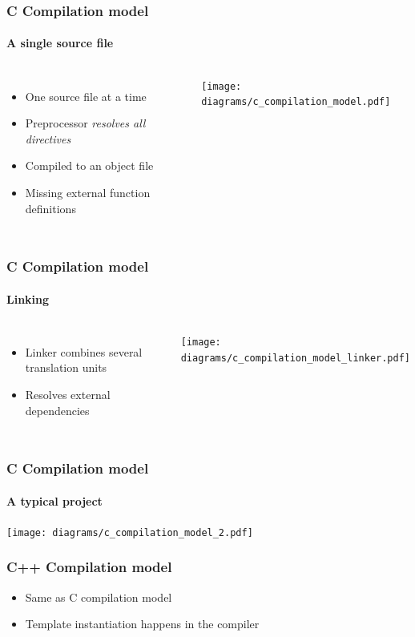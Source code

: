 \documentclass[table]{beamer}
\newcommand{\declarelesson}{\textbf{\color{themegreen}{Lesson:}} }
\begin{document}
\begin{frame}
    \frametitle{\declarelesson C Compilation model}
    \framesubtitle{A single source file}
    \begin{columns}[t]
        \column{4cm}
        \begin{itemize}
            \item One source file at a time
            \item Preprocessor \emph{resolves all directives}
            \item Compiled to an object file
            \item Missing external function definitions
        \end{itemize}
        \column[T]{8cm}
        \texttt{[image: diagrams/c\_compilation\_model.pdf]}
    \end{columns}
\end{frame}

\begin{frame}
    \frametitle{\declarelesson C Compilation model}
    \framesubtitle{Linking}
    \begin{columns}[t]
        \column{4cm}
        \begin{itemize}
            \item Linker combines several translation units
            \item Resolves external dependencies
        \end{itemize}
        \column[T]{8cm}
        \texttt{[image: diagrams/c\_compilation\_model\_linker.pdf]}
    \end{columns}
\end{frame}

\begin{frame}
    \frametitle{\declarelesson C Compilation model}
    \framesubtitle{A typical project}
    \texttt{[image: diagrams/c\_compilation\_model\_2.pdf]}
\end{frame}

\begin{frame}
    \frametitle{\declarelesson C++ Compilation model}
    \begin{itemize}
        \item Same as C compilation model
        \item Template instantiation happens in the compiler
    \end{itemize}
\end{frame}
\end{document}
